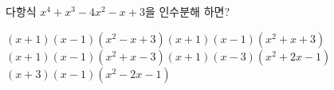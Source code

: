 다항식 $x^4+x^3-4x^2-x+3$을 인수분해 하면?
\begin{choicesv}{$(x+1)(x-1)(x^2-x+3)$}{$(x+1)(x-1)(x^2+x+3)$}{$(x+1)(x-1)(x^2+x-3)$}{$(x+1)(x-3)(x^2+2x-1)$}{$(x+3)(x-1)(x^2-2x-1)$}\end{choicesv}
